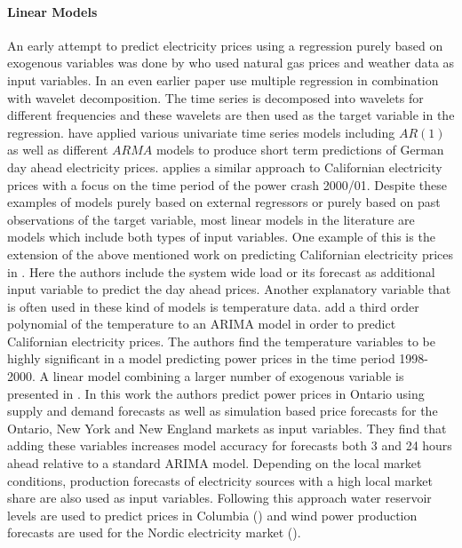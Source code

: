 \paragraph{Linear Models}
An early attempt to predict electricity prices using a regression purely based on exogenous variables was done by \cite{schmutz_electricity_2004} who used natural gas prices and weather data as input variables. In an even earlier paper \cite{kim_prediction_2002} use multiple regression in combination with wavelet decomposition. The time series is decomposed into wavelets for different frequencies and these wavelets are then used as the target variable in the regression.
 \cite{crespo_cuaresma_forecasting_2004} have applied various univariate time series models including $AR(1)$ as well as different $ARMA$ models to produce short term predictions of German day ahead electricity prices. \cite{weron_forecasting_2005} applies a similar approach to Californian electricity prices with a focus on the time period of the power crash 2000/01.  
Despite these examples of models purely based on external regressors or purely based on past observations of the target variable, most linear models in the literature are models which include both types of input variables.
One example of this is the extension of the above mentioned work on predicting Californian electricity prices in \cite{misiorek_point_2006}. Here the authors include the system wide load or its forecast as additional input variable to predict the day ahead prices. Another explanatory variable that is often used in these kind of models is temperature data. \cite{knittel_empirical_2005} add a third order polynomial of the temperature to an ARIMA model in order to predict Californian electricity prices. The authors find the temperature variables to be highly significant in a model predicting power prices in the time period 1998-2000.  A linear model combining a larger number of exogenous variable is presented in \cite{zareipour_application_2006}. In this work the authors predict power prices in Ontario using supply and demand forecasts as well as simulation based price forecasts for the Ontario, New York and New England markets as input variables. They find that adding these variables increases model accuracy for forecasts both 3 and 24 hours ahead relative to a standard ARIMA model. Depending on the local market conditions, production forecasts of electricity sources  with a high local market share are also used as input variables. Following this approach water reservoir levels are used to predict prices in Columbia (\cite{lira_short-term_2009}) and wind power production forecasts are used for the Nordic electricity market (\cite{kristiansen_forecasting_2012}).

